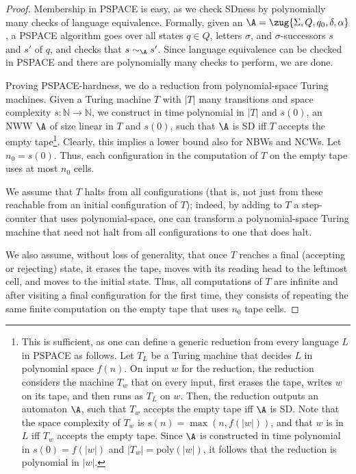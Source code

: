 \documentclass{lmcs}
\begin{document}
\begin{proof}
Membership in PSPACE is easy, as we check SDness by polynomially many checks of language equivalence. Formally, given an \nxw $\A=\zug{\Sigma,Q,q_0,\delta,\alpha}$, a PSPACE algorithm goes over all states $q \in Q$, letters $\sigma$, and $\sigma$-successors $s$ and $s'$ of $q$, and checks that $s \sim_\A s'$.  Since language equivalence can be checked in PSPACE \cite{SVW87} and there are polynomially many checks to perform, we are done. 

Proving PSPACE-hardness, we do a reduction from polynomial-space Turing machines. Given a Turing machine $T$ with
$|T|$ many transitions and space complexity $s:\mathbb{N}\rightarrow\mathbb{N}$, we construct in time polynomial in $|T|$ and $s(0)$, an NWW $\A$ of size linear in $T$ and $s(0)$, such that $\A$ is SD iff $T$ accepts the empty tape\footnote{This is sufficient, as one can define a generic reduction from every language $L$ in PSPACE as follows. Let $T_L$ be a Turing machine that decides $L$ in polynomial space $f(n)$. On input $w$ for the reduction, the reduction considers the machine $T_w$ that on every input, first erases the tape, writes $w$ on its tape, and then runs as $T_L$ on $w$. Then, the reduction outputs an automaton $\A$, such that $T_w$ accepts the empty tape iff $\A$ is SD. Note that the space complexity of $T_w$ is $s(n) = \max(n ,f(|w|))$, and that $w$ is in $L$ iff $T_w$ accepts the empty tape. Since $\A$ is constructed in time polynomial in $s(0)=f(|w|)$ and $|T_w|=\mathrm{poly}(|w|)$, it follows that the reduction is polynomial in $|w|$.}. Clearly, this implies a lower bound also for NBWs and NCWs. 
Let $n_0=s(0)$. Thus, each configuration in the computation of $T$ on the empty tape uses at most $n_0$ cells. 

We assume that $T$ halts from all configurations (that is, not just from these reachable from an initial configuration of $T$); indeed, by adding to $T$ a step-counter that uses polynomial-space, one can transform a polynomial-space Turing machine that need not halt from all configurations to one that does halt. 

We also assume, without loss of generality, that once $T$ reaches a final (accepting or rejecting) state, it erases the tape, moves with its reading head to the leftmost cell, and moves to the initial state. Thus, all computations of $T$ are infinite and after visiting a final configuration for the first time, they consists of repeating the same finite computation on the empty tape
that uses $n_0$ tape cells. 


\end{proof}
\end{document}
